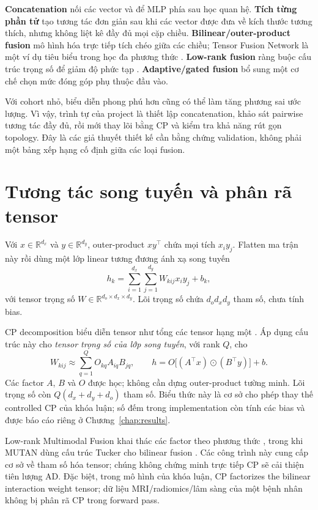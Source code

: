 \textbf{Concatenation} nối các vector và để MLP phía sau học quan hệ. \textbf{Tích từng phần tử} tạo tương tác đơn giản sau khi các vector được đưa về kích thước tương thích, nhưng không liệt kê đầy đủ mọi cặp chiều. \textbf{Bilinear/outer-product fusion} mô hình hóa trực tiếp tích chéo giữa các chiều; Tensor Fusion Network là một ví dụ tiêu biểu trong học đa phương thức \cite{zadeh2017tensor}. \textbf{Low-rank fusion} ràng buộc cấu trúc trọng số để giảm độ phức tạp \cite{liu2018lowrank}. \textbf{Adaptive/gated fusion} bổ sung một cơ chế chọn mức đóng góp phụ thuộc đầu vào.

Với cohort nhỏ, biểu diễn phong phú hơn cũng có thể làm tăng phương sai ước lượng. Vì vậy, trình tự của project là thiết lập concatenation, khảo sát pairwise tương tác đầy đủ, rồi mới thay lõi bằng CP và kiểm tra khả năng rút gọn topology. Đây là các giả thuyết thiết kế cần bằng chứng validation, không phải một bảng xếp hạng cố định giữa các loại fusion.

\section{Tương tác song tuyến và phân rã tensor}
Với $x\in\mathbb{R}^{d_x}$ và $y\in\mathbb{R}^{d_y}$, outer-product $xy^{\top}$ chứa mọi tích $x_i y_j$. Flatten ma trận này rồi dùng một lớp linear tương đương ánh xạ song tuyến
\begin{equation}
 h_k=\sum_{i=1}^{d_x}\sum_{j=1}^{d_y}W_{kij}x_i y_j+b_k,
\end{equation}
với tensor trọng số $W\in\mathbb{R}^{d_o\times d_x\times d_y}$. Lõi trọng số chứa $d_od_xd_y$ tham số, chưa tính bias.

CP decomposition biểu diễn tensor như tổng các tensor hạng một \cite{carroll1970candecomp,kolda2009tensor}. Áp dụng cấu trúc này cho \emph{tensor trọng số của lớp song tuyến}, với rank $Q$, cho
\begin{equation}
 W_{kij}\approx\sum_{q=1}^{Q}O_{kq}A_{iq}B_{jq},
 \qquad
 h=O\big[(A^{\top}x)\odot(B^{\top}y)\big]+b.
\end{equation}
Các factor $A$, $B$ và $O$ được học; không cần dựng outer-product tường minh. Lõi trọng số còn $Q(d_x+d_y+d_o)$ tham số. Biểu thức này là cơ sở cho phép thay thế controlled CP của khóa luận; số đếm trong implementation còn tính các bias và được báo cáo riêng ở Chương~\ref{chap:results}.

Low-rank Multimodal Fusion khai thác các factor theo phương thức \cite{liu2018lowrank}, trong khi MUTAN dùng cấu trúc Tucker cho bilinear fusion \cite{benyounes2017mutan}. Các công trình này cung cấp cơ sở về tham số hóa tensor; chúng không chứng minh trực tiếp CP sẽ cải thiện tiên lượng AD. Đặc biệt, trong mô hình của khóa luận, CP factorizes the bilinear interaction weight tensor; dữ liệu MRI/radiomics/lâm sàng của một bệnh nhân không bị phân rã CP trong forward pass.

